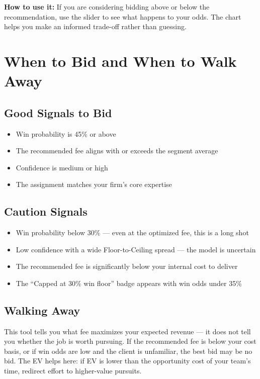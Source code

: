\documentclass[12pt,a4paper]{article}
\begin{document}
\textbf{How to use it:} If you are considering bidding above or below the
recommendation, use the slider to see what happens to your odds. The chart helps you
make an informed trade-off rather than guessing.

\section{When to Bid and When to Walk Away}

\subsection{Good Signals to Bid}
\begin{itemize}[leftmargin=2em]
    \item Win probability is 45\% or above
    \item The recommended fee aligns with or exceeds the segment average
    \item Confidence is medium or high
    \item The assignment matches your firm's core expertise
\end{itemize}

\subsection{Caution Signals}
\begin{itemize}[leftmargin=2em]
    \item Win probability below 30\% --- even at the optimized fee, this is a long shot
    \item Low confidence with a wide Floor-to-Ceiling spread --- the model is uncertain
    \item The recommended fee is significantly below your internal cost to deliver
    \item The ``Capped at 30\% win floor'' badge appears with win odds under 35\%
\end{itemize}

\subsection{Walking Away}
This tool tells you what fee maximizes your expected revenue --- it does not tell you
whether the job is worth pursuing. If the recommended fee is below your cost basis, or
if win odds are low and the client is unfamiliar, the best bid may be no bid. The EV
helps here: if EV is lower than the opportunity cost of your team's time, redirect
effort to higher-value pursuits.
\end{document}
